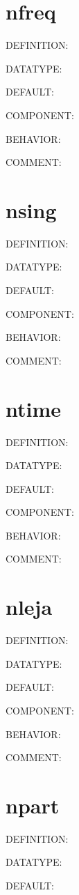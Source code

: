 \section{nfreq}
{\color{red}DEFINITION:}

{\color{green}DATATYPE:}

{\color{blue}DEFAULT:}

{\color{brown}COMPONENT:}

{\color{purple}BEHAVIOR:}

{\color{olive}COMMENT:}

\section{nsing}
{\color{red}DEFINITION:}

{\color{green}DATATYPE:}

{\color{blue}DEFAULT:}

{\color{brown}COMPONENT:}

{\color{purple}BEHAVIOR:}

{\color{olive}COMMENT:}

\section{ntime}
{\color{red}DEFINITION:}

{\color{green}DATATYPE:}

{\color{blue}DEFAULT:}

{\color{brown}COMPONENT:}

{\color{purple}BEHAVIOR:}

{\color{olive}COMMENT:}

\section{nleja}
{\color{red}DEFINITION:}

{\color{green}DATATYPE:}

{\color{blue}DEFAULT:}

{\color{brown}COMPONENT:}

{\color{purple}BEHAVIOR:}

{\color{olive}COMMENT:}

\section{npart}
{\color{red}DEFINITION:}

{\color{green}DATATYPE:}

{\color{blue}DEFAULT:}

